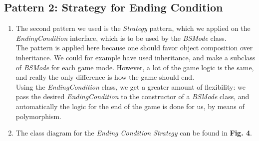 \documentclass[a4paper,11pt]{article}
\begin{document}
\subsection{Pattern 2: Strategy for Ending Condition}
\begin{enumerate}
\item The second pattern we used is the \textit{Strategy} pattern, which we applied on the \textit{EndingCondition} interface, which is to be used by the \textit{BSMode} class. \\
The pattern is applied here because one should favor object composition over inheritance. We could for example have used inheritance, and make a subclass of \textit{BSMode} for each game mode. However, a lot of the game logic is the same, and really the only difference is how the  game should end.\\
Using the \textit{EndingCondition} class, we get a greater amount of flexibility: we pass the desired \textit{EndingCondition} to the constructor of a \textit{BSMode} class, and automatically the logic for the end of the game is done for us, by means of polymorphism.\\

\newpage
\item The class diagram for the \textit{Ending Condition Strategy} can be found in \textbf{Fig. 4}. \\
\begin{minipage}{\linewidth}
\end{minipage}


\end{enumerate}
\end{document}
